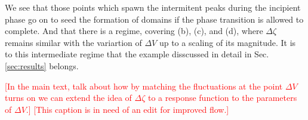 {\begin{figure*}
{    We see that those points which spawn the intermitent peaks during the incipient phase go on to seed the formation of domains if the phase transition is allowed to complete. And that there is a regime, covering (b), (c), and (d), where $\Delta\zeta$ remains similar with the variartion of $\Delta V$ up to a scaling of its magnitude. It is to this intermediate regime that the example disscussed in detail in Sec. \ref{sec:results} belongs.

    \textcolor{red}{[In the main text, talk about how by matching the fluctuations at the point $\Delta V$ turns on we can extend the idea of $\Delta\zeta$ to a response function to the parameters of $\Delta V$.]}
    \textcolor{red}{[This caption is in need of an edit for improved flow.]}
    }
    \label{fig:zetaslicecomp}
  \end{figure*}
}

\newcommand{\Fzetaslicepotform}{
  \begin{figure}
    \centering
    \caption{
    \textcolor{red}{[Place holder for a figure of $\Delta\zeta$ slices for instablities using different forms of $\Delta V$ for a few values of instability strengths. Comment on similarities and differences.]}}
    \label{fig:zetaslicepotform}
  \end{figure}
}

\newcommand{\Fdeltapspotform}{
  \begin{figure}
    \centering
    \caption{\textcolor{red}{[Place holder for a figure similar to Fig. \ref{fig:deltaps} for the alternate potentials used in Fig. \ref{fig:zetaslicepotform}.]}}
    \label{fig:deltapspotform}
  \end{figure}
}

